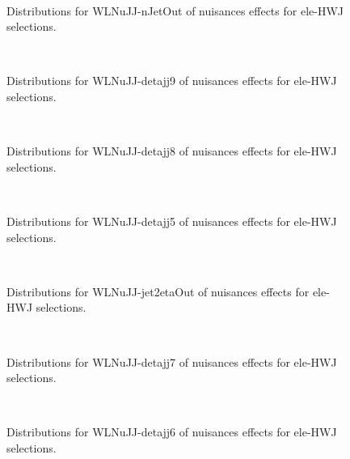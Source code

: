 


\begin{figure}[htbp]  
\centering 
\\ 
\caption{ 
   Distributions for WLNuJJ-nJetOut of nuisances effects for ele-HWJ selections.
} 
\label{fig:WLNuJJ_nJetOut_ele_HWJ} 
\end{figure} 




\begin{figure}[htbp]  
\centering 
\\ 
\caption{ 
   Distributions for WLNuJJ-detajj9 of nuisances effects for ele-HWJ selections.
} 
\label{fig:WLNuJJ_detajj9_ele_HWJ} 
\end{figure} 




\begin{figure}[htbp]  
\centering 
\\ 
\caption{ 
   Distributions for WLNuJJ-detajj8 of nuisances effects for ele-HWJ selections.
} 
\label{fig:WLNuJJ_detajj8_ele_HWJ} 
\end{figure} 




\begin{figure}[htbp]  
\centering 
\\ 
\caption{ 
   Distributions for WLNuJJ-detajj5 of nuisances effects for ele-HWJ selections.
} 
\label{fig:WLNuJJ_detajj5_ele_HWJ} 
\end{figure} 




\begin{figure}[htbp]  
\centering 
\\ 
\caption{ 
   Distributions for WLNuJJ-jet2etaOut of nuisances effects for ele-HWJ selections.
} 
\label{fig:WLNuJJ_jet2etaOut_ele_HWJ} 
\end{figure} 




\begin{figure}[htbp]  
\centering 
\\ 
\caption{ 
   Distributions for WLNuJJ-detajj7 of nuisances effects for ele-HWJ selections.
} 
\label{fig:WLNuJJ_detajj7_ele_HWJ} 
\end{figure} 




\begin{figure}[htbp]  
\centering 
\\ 
\caption{ 
   Distributions for WLNuJJ-detajj6 of nuisances effects for ele-HWJ selections.
} 
\label{fig:WLNuJJ_detajj6_ele_HWJ} 
\end{figure} 




